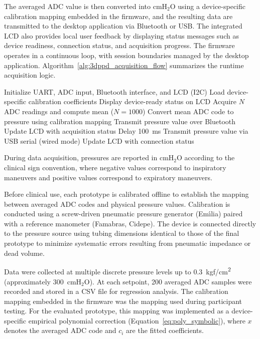 \documentclass{ieeeaccess}
\begin{document}
The averaged ADC value is then converted into \ensuremath{\mathrm{cmH_2O}} using a device-specific calibration mapping embedded in the firmware, and the resulting data are transmitted to the desktop application via Bluetooth or USB. The integrated LCD also provides local user feedback by displaying status messages such as device readiness, connection status, and acquisition progress. The firmware operates in a continuous loop, with session boundaries managed by the desktop application. Algorithm~\ref{alg:3dppd_acquisition_flow} summarizes the runtime acquisition logic.


\begin{algorithm}[htp]
  \caption{3D-PPD data acquisition/transmission flow.}
  \label{alg:3dppd_acquisition_flow}
  \small
  \renewcommand{\baselinestretch}{1.3}
  \selectfont
    \begin{algorithmic}[1]
      \STATE Initialize UART, ADC input, Bluetooth interface, and LCD (I2C)
      \STATE Load device-specific calibration coefficients
      \STATE Display device-ready status on LCD
        \STATE Acquire \(N\) ADC readings and compute mean (\(N=1000\))
        \STATE Convert mean ADC code to pressure using calibration mapping
          \STATE Transmit pressure value over Bluetooth
          \STATE Update LCD with acquisition status
          \STATE Delay 100~ms
        \ELSE
          \STATE Transmit pressure value via USB serial (wired mode)
          \STATE Update LCD with connection status
        \ENDIF
      \ENDWHILE
    \end{algorithmic}
\end{algorithm}

During data acquisition, pressures are reported in \ensuremath{\mathrm{cmH_2O}} according to the clinical sign convention, where negative values correspond to inspiratory maneuvers and positive values correspond to expiratory maneuvers.

Before clinical use, each prototype is calibrated offline to establish the mapping between averaged ADC codes and physical pressure values. Calibration is conducted using a screw-driven pneumatic pressure generator (Em\'{\i}lia) paired with a reference manometer (Famabras, Cidepe). The device is connected directly to the pressure source using tubing dimensions identical to those of the final prototype to minimize systematic errors resulting from pneumatic impedance or dead volume.

Data were collected at multiple discrete pressure levels up to 0.3~kgf/cm\textsuperscript{2} (approximately 300~\ensuremath{\mathrm{cmH_2O}}). At each setpoint, 200 averaged ADC samples were recorded and stored in a CSV file for regression analysis. {The calibration mapping embedded in the firmware was the mapping used during participant testing.} For the evaluated prototype, {this mapping was implemented as a device-specific empirical polynomial correction} (Equation~\ref{eq:poly_symbolic}), where \(x\) denotes the averaged ADC code and \(c_i\) are the fitted coefficients.
\end{document}
